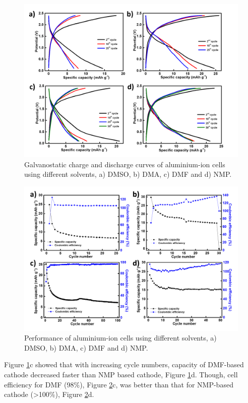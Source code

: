 \begin{figure}[tbh!]
\centering
\includegraphics[width=\textwidth]{Figures/chap7fig/hBNsolvents}
\caption{Galvanostatic charge and discharge curves of aluminium-ion cells using different solvents, a) DMSO, b) DMA, c) DMF and d) NMP.}
\label{Figures/chap7fig:hBNsolvents}
\end{figure}

\begin{figure}[tbh!]
\centering
\includegraphics[width=\textwidth]{Figures/chap7fig/hBNsolventsCE}
\caption{Performance of aluminium-ion cells using different solvents, a) DMSO, b) DMA, c) DMF and d) NMP.}
\label{Figures/chap7fig:hBNsolventsCE}
\end{figure}

Figure \ref{Figures/chap7fig:hBNsolvents}c showed that with increasing cycle numbers, capacity of DMF-based cathode decreased faster than NMP based cathode, Figure \ref{Figures/chap7fig:hBNsolvents}d. Though, cell efficiency for DMF (98\%), Figure \ref{Figures/chap7fig:hBNsolventsCE}c, was better than that for NMP-based cathode (>100\%), Figure \ref{Figures/chap7fig:hBNsolventsCE}d.

